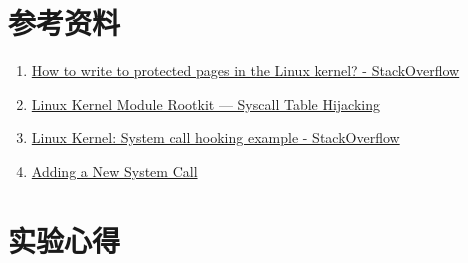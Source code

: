 \documentclass[UTF8]{ctexrep}
\begin{document}
    \section{参考资料}
    
    \begin{enumerate}
        \item \href{https://stackoverflow.com/questions/58512430/how-to-write-to-protected-pages-in-the-linux-kernel/60564037#60564037}{How to write to protected pages in the Linux kernel? - StackOverflow}
        \item \href{https://infosecwriteups.com/linux-kernel-module-rootkit-syscall-table-hijacking-8f1bc0bd099c}{Linux Kernel Module Rootkit — Syscall Table Hijacking}
        \item \href{https://stackoverflow.com/questions/2103315/linux-kernel-system-call-hooking-example}{Linux Kernel: System call hooking example - StackOverflow}
        \item \href{https://www.kernel.org/doc/html/latest/process/adding-syscalls.html}{Adding a New System Call}
    \end{enumerate}
    \vspace{.3cm}

    \section{实验心得}
\end{document}
